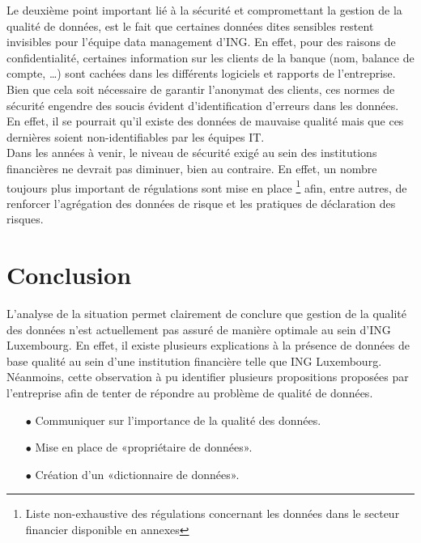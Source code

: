 \documentclass[a4paper, 12pt, french]{article}
\begin{document}
Le deuxième point important lié à la sécurité et compromettant la gestion de la qualité de données, est le fait que certaines données dites sensibles restent invisibles pour l’équipe data management d’ING. En effet, pour des raisons de confidentialité, certaines information sur les clients de la banque (nom, balance de compte, …) sont cachées dans les différents logiciels et rapports de l’entreprise. Bien que cela soit nécessaire de garantir l'anonymat des clients, ces normes de sécurité engendre des soucis évident d'identification d'erreurs dans les données. En effet, il se pourrait qu’il existe des données de mauvaise qualité mais que ces dernières soient non-identifiables par les équipes IT. \\

Dans les années à venir, le niveau de sécurité exigé au sein des institutions financières ne devrait pas diminuer, bien au contraire. En effet, un nombre toujours plus important de régulations sont mise en place \footnote{Liste non-exhaustive des régulations concernant les données dans le secteur financier disponible en annexes} afin, entre autres, de renforcer l'agrégation des données de risque et les pratiques de déclaration des risques.

\section{Conclusion}

L’analyse de la situation permet clairement de conclure que gestion de la qualité des données n’est actuellement pas assuré de manière optimale au sein d’ING Luxembourg. En effet, il existe plusieurs explications à la présence de données de base qualité au sein d'une institution financière telle que ING Luxembourg. Néanmoins, cette observation à pu identifier plusieurs propositions proposées par l’entreprise afin de tenter de répondre au problème de qualité de données. \\

\vspace{0.25cm}
\begin{itemize}
\item[$\bullet$] Communiquer sur l’importance de la qualité des données.
\item[$\bullet$] Mise en place de «propriétaire de données».
\item[$\bullet$] Création d’un «dictionnaire de données».
\end{itemize}
\vspace{0.5cm}
\end{document}
